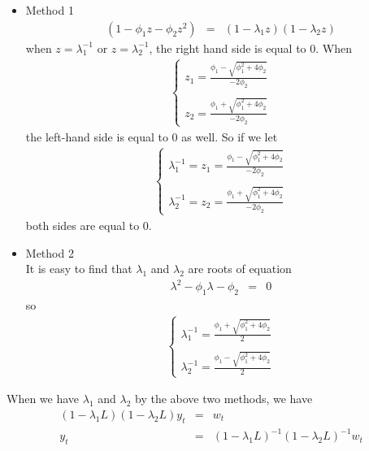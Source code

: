 \begin{itemize}
\item Method 1
\begin{eqnarray*}
(1-\phi_{1}z-\phi_{2}z^{2})&=&(1-\lambda_{1}z)(1-\lambda_{2}z)
\end{eqnarray*}
when $z=\lambda_{1}^{-1}$ or $z=\lambda_{2}^{-1}$, the right hand side is equal to 0. When
\begin{eqnarray*}
\begin{cases}
z_{1}=\frac{\phi_{1}-\sqrt{\phi_{1}^{2}+4\phi_{2}}}{-2\phi_{2}}\\
\\
z_{2}=\frac{\phi_{1}+\sqrt{\phi_{1}^{2}+4\phi_{2}}}{-2\phi_{2}}
\end{cases}
\end{eqnarray*}
the left-hand side is equal to 0 as well. So if we let 
\begin{eqnarray*}
\begin{cases}
\lambda_{1}^{-1}=z_{1}=\frac{\phi_{1}-\sqrt{\phi_{1}^{2}+4\phi_{2}}}{-2\phi_{2}}\\
\\
\lambda_{2}^{-1}=z_{2}=\frac{\phi_{1}+\sqrt{\phi_{1}^{2}+4\phi_{2}}}{-2\phi_{2}}
\end{cases}
\end{eqnarray*}
both sides are equal to 0.
\item Method 2\\
It is easy to find that $\lambda_{1}$ and $\lambda_{2}$ are roots of equation 
\begin{eqnarray*}
\lambda^{2}-\phi_{1}\lambda-\phi_{2}&=&0
\end{eqnarray*}
so 
\begin{eqnarray*}
\begin{cases}
\lambda_{1}^{-1}=\frac{\phi_{1}+\sqrt{\phi_{1}^{2}+4\phi_{2}}}{2}\\
\\
\lambda_{2}^{-1}=\frac{\phi_{1}-\sqrt{\phi_{1}^{2}+4\phi_{2}}}{2}
\end{cases}
\end{eqnarray*}
\end{itemize}

When we have $\lambda_{1}$ and $\lambda_{2}$ by the above two methods, we have 
\begin{eqnarray*}
(1-\lambda_{1}L)(1-\lambda_{2}L)y_{t}&=&w_{t}\\
y_{t}&=&(1-\lambda_{1}L)^{-1}(1-\lambda_{2}L)^{-1}w_{t}
\end{eqnarray*}

